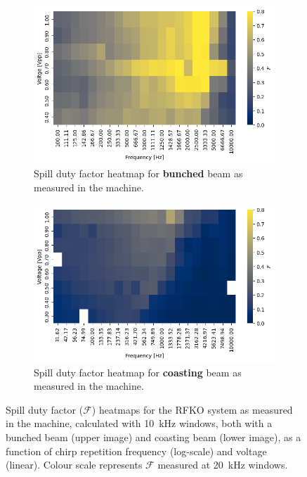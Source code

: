 \documentclass[a4paper,twoside,11pt]{report}
\begin{document}
\begin{figure}[h]
  \centering
  \begin{subfigure}[b]{0.9\linewidth}
    \includegraphics*[width=\linewidth]{rf_on_heatmap_10.png}
    \caption{Spill duty factor heatmap for \textbf{bunched} beam as measured in the machine.}\label{sdf_on_meas}
  \end{subfigure}
  \begin{subfigure}[b]{0.9\linewidth}
    \includegraphics*[width=\linewidth]{rf_off_heatmap_10.png}
    \caption{Spill duty factor heatmap for \textbf{coasting} beam as measured in the machine.}\label{sdf_off_meas}
  \end{subfigure}
  \cprotect\caption[Spill duty factor heatmaps for bunched and coasting beams]{Spill duty factor ($\mathcal{F}$) heatmaps for the RFKO system as measured in the machine, calculated with \qty{10}{\kilo\hertz} windows, both with a bunched beam (upper image) and coasting beam (lower image), as a function of chirp repetition frequency (log-scale) and voltage (linear). Colour scale represents $\mathcal{F}$ measured at \qty{20}{\kilo\hertz} windows.}\label{fig:sdf_meas}
\end{figure}
\end{document}
